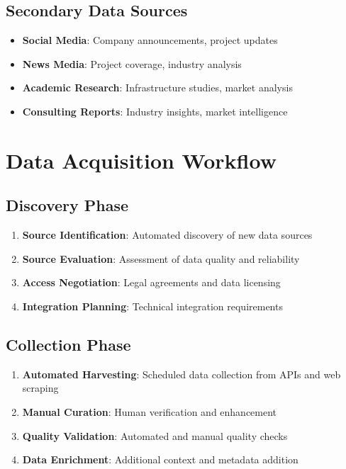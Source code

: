 \documentclass[business]{../templates/infraradar-main}
\begin{document}
\subsection{Secondary Data Sources}
\begin{itemize}
    \item \textbf{Social Media}: Company announcements, project updates
    \item \textbf{News Media}: Project coverage, industry analysis
    \item \textbf{Academic Research}: Infrastructure studies, market analysis
    \item \textbf{Consulting Reports}: Industry insights, market intelligence
\end{itemize}

\section{Data Acquisition Workflow}

\subsection{Discovery Phase}
\begin{enumerate}
    \item \textbf{Source Identification}: Automated discovery of new data sources
    \item \textbf{Source Evaluation}: Assessment of data quality and reliability
    \item \textbf{Access Negotiation}: Legal agreements and data licensing
    \item \textbf{Integration Planning}: Technical integration requirements
\end{enumerate}

\subsection{Collection Phase}
\begin{enumerate}
    \item \textbf{Automated Harvesting}: Scheduled data collection from APIs and web scraping
    \item \textbf{Manual Curation}: Human verification and enhancement
    \item \textbf{Quality Validation}: Automated and manual quality checks
    \item \textbf{Data Enrichment}: Additional context and metadata addition
\end{enumerate}
\end{document}
